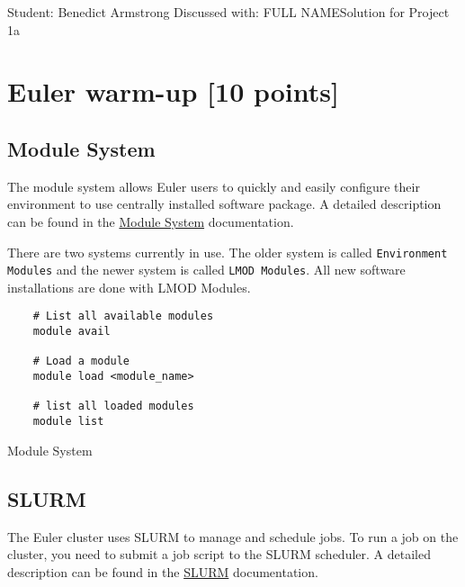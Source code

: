 \documentclass[unicode,11pt,a4paper,oneside,numbers=endperiod,openany]{scrartcl}
\begin{document}
\setassignment
{}

{Student: Benedict Armstrong}
{Discussed with: FULL NAME}{Solution for Project 1a}{}
\newline




\section{Euler warm-up [10 points]}

\subsection{Module System}

The module system allows Euler users to quickly and easily configure their environment to use centrally installed software package. A detailed description can be found in the \href{https://scicomp.ethz.ch/wiki/Modules_and_applications}{Module System} documentation.

There are two systems currently in use. The older system is called \texttt{Environment Modules} and the newer system is called \texttt{LMOD Modules}. All new software installations are done with LMOD Modules.

\begin{listing}[!ht]
    \begin{verbatim}
    # List all available modules
    module avail
    
    # Load a module
    module load <module_name>
    
    # list all loaded modules
    module list
    \end{verbatim}
    \caption{Module System}
    \label{lst:module_system}
\end{listing}

\subsection{SLURM}

The Euler cluster uses SLURM to manage and schedule jobs. To run a job on the cluster, you need to submit a job script to the SLURM scheduler. A detailed description can be found in the \href{https://scicomp.ethz.ch/wiki/Job_management_with_SLURM}{SLURM} documentation.
\end{document}
